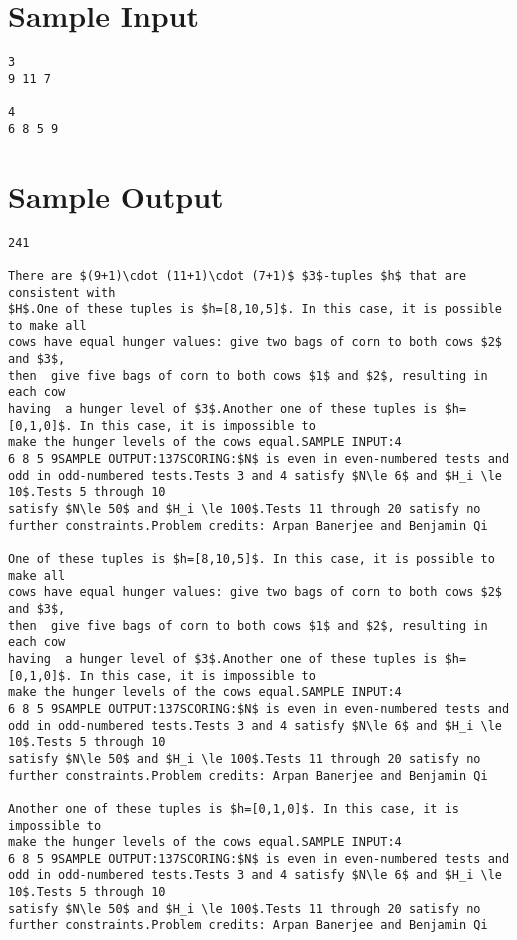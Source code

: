 \documentclass[12pt]{article}
\begin{document}
\section*{Sample Input}
\begin{verbatim}
3
9 11 7

4
6 8 5 9
\end{verbatim}

\section*{Sample Output}
\begin{verbatim}
241

There are $(9+1)\cdot (11+1)\cdot (7+1)$ $3$-tuples $h$ that are consistent with
$H$.One of these tuples is $h=[8,10,5]$. In this case, it is possible to make all
cows have equal hunger values: give two bags of corn to both cows $2$ and $3$,
then  give five bags of corn to both cows $1$ and $2$, resulting in each cow
having  a hunger level of $3$.Another one of these tuples is $h=[0,1,0]$. In this case, it is impossible to 
make the hunger levels of the cows equal.SAMPLE INPUT:4
6 8 5 9SAMPLE OUTPUT:137SCORING:$N$ is even in even-numbered tests and odd in odd-numbered tests.Tests 3 and 4 satisfy $N\le 6$ and $H_i \le 10$.Tests 5 through 10
satisfy $N\le 50$ and $H_i \le 100$.Tests 11 through 20 satisfy no
further constraints.Problem credits: Arpan Banerjee and Benjamin Qi

One of these tuples is $h=[8,10,5]$. In this case, it is possible to make all
cows have equal hunger values: give two bags of corn to both cows $2$ and $3$,
then  give five bags of corn to both cows $1$ and $2$, resulting in each cow
having  a hunger level of $3$.Another one of these tuples is $h=[0,1,0]$. In this case, it is impossible to 
make the hunger levels of the cows equal.SAMPLE INPUT:4
6 8 5 9SAMPLE OUTPUT:137SCORING:$N$ is even in even-numbered tests and odd in odd-numbered tests.Tests 3 and 4 satisfy $N\le 6$ and $H_i \le 10$.Tests 5 through 10
satisfy $N\le 50$ and $H_i \le 100$.Tests 11 through 20 satisfy no
further constraints.Problem credits: Arpan Banerjee and Benjamin Qi

Another one of these tuples is $h=[0,1,0]$. In this case, it is impossible to 
make the hunger levels of the cows equal.SAMPLE INPUT:4
6 8 5 9SAMPLE OUTPUT:137SCORING:$N$ is even in even-numbered tests and odd in odd-numbered tests.Tests 3 and 4 satisfy $N\le 6$ and $H_i \le 10$.Tests 5 through 10
satisfy $N\le 50$ and $H_i \le 100$.Tests 11 through 20 satisfy no
further constraints.Problem credits: Arpan Banerjee and Benjamin Qi


\end{verbatim}
\end{document}
